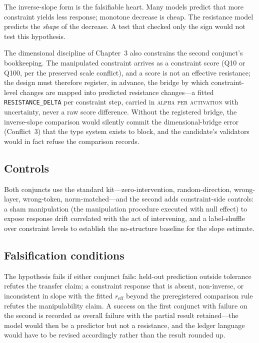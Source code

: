 The inverse-slope form is the falsifiable heart. Many models predict that more constraint yields less response; monotone decrease is cheap. The resistance model predicts the \emph{shape} of the decrease. A test that checked only the sign would not test this hypothesis.

The dimensional discipline of Chapter~3 also constrains the second conjunct's bookkeeping. The manipulated constraint arrives as a constraint score (Q10 or Q100, per the preserved scale conflict), and a score is not an effective resistance; the design must therefore register, in advance, the bridge by which constraint-level changes are mapped into predicted resistance changes---a fitted \texttt{RESISTANCE\_DELTA} per constraint step, carried in \textsc{alpha per activation} with uncertainty, never a raw score difference. Without the registered bridge, the inverse-slope comparison would silently commit the dimensional-bridge error (Conflict~3) that the type system exists to block, and the candidate's validators would in fact refuse the comparison records.

\subsection{Controls}

Both conjuncts use the standard kit---zero-intervention, random-direction, wrong-layer, wrong-token, norm-matched---and the second adds constraint-side controls: a sham manipulation (the manipulation procedure executed with null effect) to expose response drift correlated with the act of intervening, and a label-shuffle over constraint levels to establish the no-structure baseline for the slope estimate.

\subsection{Falsification conditions}

The hypothesis fails if either conjunct fails: held-out prediction outside tolerance refutes the transfer claim; a constraint response that is absent, non-inverse, or inconsistent in slope with the fitted $r_{\mathrm{eff}}$ beyond the preregistered comparison rule refutes the manipulability claim. A success on the first conjunct with failure on the second is recorded as overall failure with the partial result retained---the model would then be a predictor but not a resistance, and the ledger language would have to be revised accordingly rather than the result rounded up.

